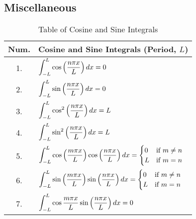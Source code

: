\subsection{Miscellaneous}
\begin{table}[h]
    \centering
    \renewcommand{\arraystretch}{2.6}
    \caption{Table of Cosine and Sine Integrals}
    \label{table:1.2}
    \begin{tabular}{|c|m{10cm}|}\hline
       Num.& \centering Cosine and Sine Integrals (Period, $L$)\arraybackslash \\ \hline\hline
       1.&$\displaystyle\int_{-L}^{L}\cos\left(\frac{n\pi x}{L}\right)dx=0$\\
       2.&$\displaystyle\int_{-L}^{L}\sin\left(\frac{n\pi x}{L}\right)dx=0$\\
       3.&$\displaystyle\int_{-L}^{L}\cos^2\left(\frac{n\pi x}{L}\right)dx=L$\\
       4.&$\displaystyle\int_{-L}^{L}\sin^2\left(\frac{n\pi x}{L}\right)dx=L$\\
       5.&$\displaystyle\int_{-L}^{L}\cos\left(\frac{m\pi x}{L}\right)\cos\left(\frac{n\pi x}{L}\right)dx=\begin{cases}
           0 & \text{if }m\neq n\\
           L & \text{if }m=n
       \end{cases}$\\
       6.&$\displaystyle\int_{-L}^{L}\sin\left(\frac{m\pi x}{L}\right)\sin\left(\frac{n\pi x}{L}\right)dx=\begin{cases}
           0 & \text{if }m\neq n\\
           L & \text{if }m=n
       \end{cases}$\\
       7.&$\displaystyle\int_{-L}^{L}\cos{\frac{m\pi x}{L}}\sin\left(\frac{n\pi x}{L}\right)dx=0$\\ \hline
    \end{tabular}
\end{table}
\newpage